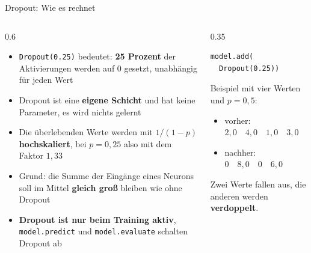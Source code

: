 \begin{frame}[fragile]{Dropout: Wie es rechnet}
\footnotesize
\begin{columns}
\begin{column}{0.6\linewidth}
\begin{itemize}
  \item \texttt{Dropout(0.25)} bedeutet: \textbf{25 Prozent} der Aktivierungen werden auf 0 gesetzt, unabhängig für jeden Wert
  \item Dropout ist eine \textbf{eigene Schicht} und hat keine Parameter, es wird nichts gelernt
  \item Die überlebenden Werte werden mit $1/(1-p)$ \textbf{hochskaliert}, bei $p = 0{,}25$ also mit dem Faktor $1{,}33$
  \item Grund: die Summe der Eingänge eines Neurons soll im Mittel \textbf{gleich groß} bleiben wie ohne Dropout
  \item \textbf{Dropout ist nur beim Training aktiv}, \texttt{model.predict} und \texttt{model.evaluate} schalten Dropout ab
\end{itemize}
\end{column}
\begin{column}{0.35\linewidth}
\begin{verbatim}
model.add(
  Dropout(0.25))
\end{verbatim}
\vspace{0.3cm}
Beispiel mit vier Werten und $p = 0{,}5$:
\begin{itemize}
  \item vorher: $2{,}0 \quad 4{,}0 \quad 1{,}0 \quad 3{,}0$
  \item nachher: $0 \quad 8{,}0 \quad 0 \quad 6{,}0$
\end{itemize}
Zwei Werte fallen aus, die anderen werden \textbf{verdoppelt}.
\end{column}
\end{columns}
\end{frame}

